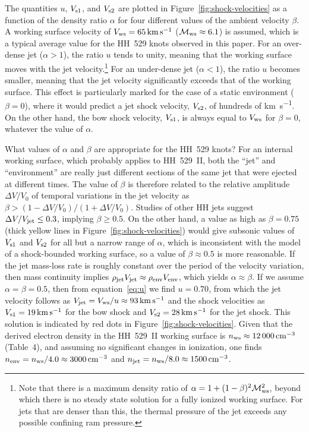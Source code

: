 \documentclass[useAMS, usenatbib]{mnras}
\begin{document}
The quantities \(u\), \(V_{\text{s1}}\), and \(V_{\text{s2}}\) are plotted in Figure~\ref{fig:shock-velocities} as a function of the density ratio \(\alpha\)
for four different values of the ambient velocity \(\beta\).
A working surface velocity of \(V_{\mathrm{ws}} = \SI{65}{km.s^{-1}}\)
(\(\mathcal{M}_{\mathrm{ws}} \approx 6.1\)) is assumed,
which is a typical average value for the HH~529 knots observed in this paper.
For an over-dense jet (\(\alpha > 1\)), the ratio \(u\) tends to unity,
meaning that the working surface moves with the jet velocity.\footnote{
  Note that there is a maximum density ratio of \(\alpha = 1 + (1 - \beta)^2 \mathcal{M}_{\mathrm{ws}}^2\),
  beyond which there is no steady state solution for a fully ionized working surface.
  For jets that are denser than this, the thermal pressure of the jet exceeds any possible confining ram pressure.
}
For an under-dense jet (\(\alpha < 1\)), the ratio \(u\) becomes smaller,
meaning that the jet velocity significantly exceeds that of the working surface.
This effect is particularly marked for the case of a static environment (\(\beta = 0\)), where it would predict a jet shock velocity, \(V_{\text{s2}}\), of hundreds of \si{km.s^{-1}}.  On the other hand, the bow shock velocity,
\(V_{\text{s1}}\), is always equal to \(V_{\mathrm{ws}}\) for \(\beta = 0\), whatever the value of \(\alpha\).

What values of \(\alpha\) and \(\beta\) are appropriate for the HH~529 knots?
For an internal working surface, which probably applies to HH~529~II,
both the ``jet'' and ``environment''
are really just different sections of the same jet that were ejected at different times.
The value of \(\beta\) is therefore related to the relative amplitude
\(\Delta V/V_0\) of temporal variations in the jet velocity
as \(\beta > (1 - \Delta V/V_0) / (1 + \Delta V /V_0)\).
Studies of other HH jets \citep{Raga:1998a, Esquivel:2007a, Castellanos-Ramirez:2018a} suggest \(\Delta V/V_{\mathrm{jet}} \le 0.3\), implying \(\beta \ge 0.5\).  On the other hand, a value as high as \(\beta = 0.75\) (thick yellow lines in Figure~\ref{fig:shock-velocities}) would give subsonic values of \(V_{\text{s1}}\) and \(V_{\text{s2}}\) for all but a narrow range of \(\alpha\), which is inconsistent with the model of a shock-bounded working surface,
so a value of \(\beta \approx 0.5\) is more reasonable.
If the jet mass-loss rate is roughly constant
over the period of the velocity variation, then mass continuity implies
\(\rho_{\mathrm{jet}} V_{\mathrm{jet}} \approx \rho_{\mathrm{env}} V_{\mathrm{env}}\), which yields \(\alpha \approx \beta\).
If we assume \(\alpha = \beta = 0.5 \), then from equation~\eqref{eq:u} we find
\(u = 0.70 \), from which the jet velocity follows as
\(V_{\mathrm{jet}} = V_{\mathrm{ws}} / u \approx \SI{93}{km.s^{-1}}\)
and the shock velocities as
\(V_{\text{s1}} = \SI{19}{km.s^{-1}}\) for the bow shock and
\(V_{\text{s2}} = \SI{28}{km.s^{-1}}\) for the jet shock.
This solution is indicated by red dots in Figure~\ref{fig:shock-velocities}.
Given that the derived electron density in the HH~529~II working surface is
\(n_{\mathrm{ws}} \approx \SI{12000}{cm^{-3}}\) (Table~4),
and assuming no significant changes in ionization,
one finds \(n_{\mathrm{env}} = n_{\mathrm{ws}} / 4.0 \approx \SI{3000}{cm^{-3}}\)
and \(n_{\mathrm{jet}} = n_{\mathrm{ws}} / 8.0 \approx \SI{1500}{cm^{-3}}\).
\end{document}
